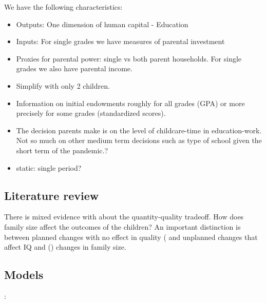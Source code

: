 We have the following characteristics:

\begin{itemize}
    \item Outputs: One dimension of human capital - Education
    \item Inputs: For single grades we have measures of parental investment
    \item Proxies for parental power: single vs both parent households. For single grades we also have parental income.
    \item Simplify with only 2 children.
    \item Information on initial endowments roughly for all grades (GPA) or more precisely for some grades (standardized scores).
    \item The decision parents make is on the level of childcare-time in education-work. Not so much on other medium term decisions such as type of school given the short term of the pandemic.?
    \item static: single period?
\end{itemize}


\subsection{Literature review}

There is mixed evidence with about the quantity-quality tradeoff. How does family size affect the outcomes of the children? An important distinction is between planned changes with no effect in quality (\cite{black_more_2005} and unplanned changes that affect IQ and  (\cite{black_small_2010}) changes in family size. 



\subsection{Models}

\cite{behrman_parental_1982}: 

\cite{behrman_chapter_1997}

\cite{behrman_parental_2022}

\cite{conti_parental_2022}

\cite{bharadwaj_health_2018}

\cite{rosenzweig_heterogeneity_1988}

\cite{cunha_technology_2007}

\cite{yi_early_2015}

\cite{giannola_parental_2024}

